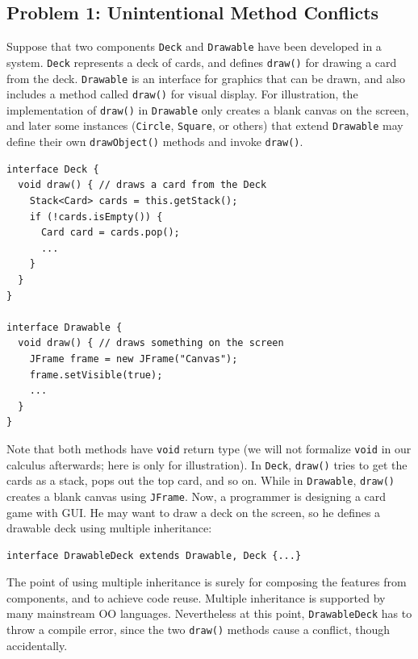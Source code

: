 \subsection{Problem 1: Unintentional Method Conflicts}
Suppose that two components \lstinline|Deck| and \lstinline|Drawable| 
have been developed in a system.  \lstinline|Deck| represents a deck
of cards, and defines \lstinline|draw()| for drawing a card from the
deck.  \lstinline|Drawable| is an interface for graphics that
can be drawn, and also includes a method called \lstinline|draw()| for
visual display. For illustration, the implementation of
\lstinline|draw()| in \lstinline|Drawable| only creates a blank canvas
on the screen, and later some instances (\lstinline|Circle|,
\lstinline|Square|, or others) that extend \lstinline|Drawable| may
define their own \lstinline|drawObject()| methods and invoke
\lstinline|draw()|.

\vspace{3pt}\begin{lstlisting}
interface Deck {
  void draw() { // draws a card from the Deck
    Stack<Card> cards = this.getStack();
    if (!cards.isEmpty()) {
      Card card = cards.pop();
      ...
    }
  }
}

interface Drawable {
  void draw() { // draws something on the screen
    JFrame frame = new JFrame("Canvas");
    frame.setVisible(true);
    ...
  }
}
\end{lstlisting}\vspace{3pt}
Note that both methods have \lstinline|void| return type (we will not formalize
\lstinline|void| in our calculus afterwards; here is only for illustration). In \lstinline|Deck|, \lstinline|draw()| tries to get the cards as a stack, pops
out the top card, and so on. While in \lstinline|Drawable|, \lstinline|draw()|
creates a blank canvas using \lstinline|JFrame|. Now, a programmer is designing a
card game with GUI. He may want to draw a deck on the screen, so he defines a drawable
deck using multiple inheritance:

\vspace{3pt}\begin{lstlisting}
interface DrawableDeck extends Drawable, Deck {...} 
\end{lstlisting}\vspace{3pt}
The point of using multiple inheritance is surely for composing the features from
components, and to achieve code reuse. Multiple inheritance is supported by many mainstream OO
languages. Nevertheless at this point, \lstinline|DrawableDeck| has to throw a compile
error, since the two \lstinline|draw()| methods cause a conflict, though accidentally.

